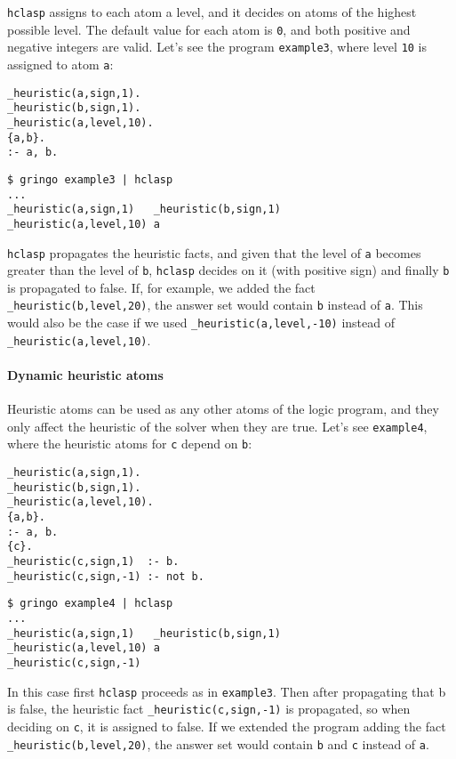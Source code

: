 \texttt{hclasp} assigns to each atom a level, and it decides on atoms of the highest possible level. The default value for each atom is \texttt{0},  and both positive and negative integers are valid. Let's see the program \texttt{example3}, where level \texttt{10} is assigned to atom \texttt{a}: 
\begin{verbatim}
_heuristic(a,sign,1).
_heuristic(b,sign,1).
_heuristic(a,level,10).
{a,b}.
:- a, b.
\end{verbatim}
\begin{verbatim}
$ gringo example3 | hclasp                                                                                  
...
_heuristic(a,sign,1)   _heuristic(b,sign,1) 
_heuristic(a,level,10) a\end{verbatim}

\texttt{hclasp} propagates the heuristic facts, and given that the level of \texttt{a} becomes greater than the level of \texttt{b}, \texttt{hclasp} decides on it (with positive sign) and finally \texttt{b} is propagated to false. If, for example, we added the fact \texttt{\_heuristic(b,level,20)},  the answer set would contain \texttt{b} instead of \texttt{a}. This would also be the case if we used \texttt{\_heuristic(a,level,-10)} instead of \texttt{\_heuristic(a,level,10)}.  

\paragraph{Dynamic heuristic atoms}

Heuristic atoms can be used as any other atoms of the logic program, and they only affect the heuristic of the solver when they are true. Let's see \texttt{example4}, where the heuristic atoms for \texttt{c} depend on \texttt{b}: 
\begin{verbatim}
_heuristic(a,sign,1).
_heuristic(b,sign,1).
_heuristic(a,level,10).
{a,b}.
:- a, b.
{c}.
_heuristic(c,sign,1)  :- b.
_heuristic(c,sign,-1) :- not b.
\end{verbatim}
\begin{verbatim}
$ gringo example4 | hclasp                                                                                 
...
_heuristic(a,sign,1)   _heuristic(b,sign,1) 
_heuristic(a,level,10) a
_heuristic(c,sign,-1)\end{verbatim}

 In this case first \texttt{hclasp} proceeds as in \texttt{example3}.  Then after propagating that b is false,  the heuristic fact \texttt{\_heuristic(c,sign,-1)} is propagated, so when deciding on \texttt{c}, it is assigned to false.  If we extended the program adding the fact \texttt{\_heuristic(b,level,20)}, the answer set would contain \texttt{b} and \texttt{c} instead of \texttt{a}.  

